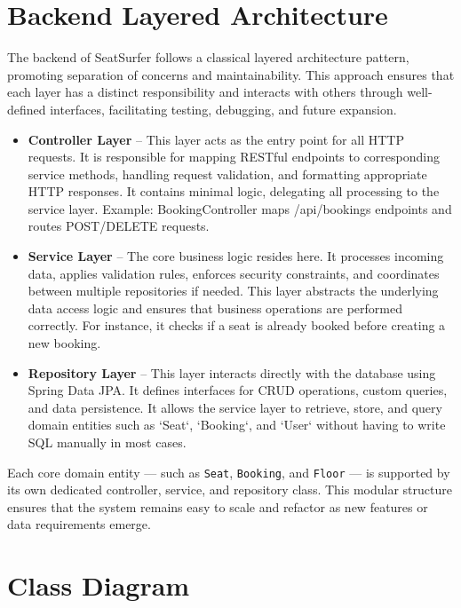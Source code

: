 \documentclass[12pt,a4paper]{report}
\begin{document}
\section{Backend Layered Architecture}

The backend of SeatSurfer follows a classical layered architecture pattern, promoting separation of concerns and maintainability. This approach ensures that each layer has a distinct responsibility and interacts with others through well-defined interfaces, facilitating testing, debugging, and future expansion.

\begin{itemize}
\item \textbf{Controller Layer} – This layer acts as the entry point for all HTTP requests. It is responsible for mapping RESTful endpoints to corresponding service methods, handling request validation, and formatting appropriate HTTP responses. It contains minimal logic, delegating all processing to the service layer. Example: BookingController maps /api/bookings endpoints and routes POST/DELETE requests.
\item \textbf{Service Layer} – The core business logic resides here. It processes incoming data, applies validation rules, enforces security constraints, and coordinates between multiple repositories if needed. This layer abstracts the underlying data access logic and ensures that business operations are performed correctly. For instance, it checks if a seat is already booked before creating a new booking.
\item \textbf{Repository Layer} – This layer interacts directly with the database using Spring Data JPA. It defines interfaces for CRUD operations, custom queries, and data persistence. It allows the service layer to retrieve, store, and query domain entities such as `Seat`, `Booking`, and `User` without having to write SQL manually in most cases.
\end{itemize}

Each core domain entity — such as \texttt{Seat}, \texttt{Booking}, and \texttt{Floor} — is supported by its own dedicated controller, service, and repository class. This modular structure ensures that the system remains easy to scale and refactor as new features or data requirements emerge.

\section{Class Diagram}
\end{document}
